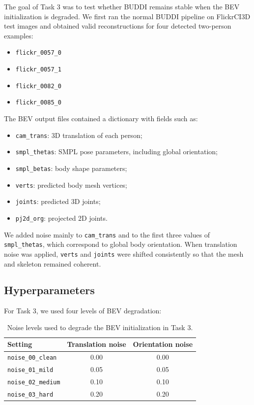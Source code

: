 \documentclass[10pt]{article}
\begin{document}
The goal of Task 3 was to test whether BUDDI remains stable when the BEV initialization is degraded. We first ran the normal BUDDI pipeline on FlickrCI3D test images and obtained valid reconstructions for four detected two-person examples:

\begin{itemize}
    \item \texttt{flickr\_0057\_0}
    \item \texttt{flickr\_0057\_1}
    \item \texttt{flickr\_0082\_0}
    \item \texttt{flickr\_0085\_0}
\end{itemize}

The BEV output files contained a dictionary with fields such as:

\begin{itemize}
    \item \texttt{cam\_trans}: 3D translation of each person;
    \item \texttt{smpl\_thetas}: SMPL pose parameters, including global orientation;
    \item \texttt{smpl\_betas}: body shape parameters;
    \item \texttt{verts}: predicted body mesh vertices;
    \item \texttt{joints}: predicted 3D joints;
    \item \texttt{pj2d\_org}: projected 2D joints.
\end{itemize}

We added noise mainly to \texttt{cam\_trans} and to the first three values of \texttt{smpl\_thetas}, which correspond to global body orientation. When translation noise was applied, \texttt{verts} and \texttt{joints} were shifted consistently so that the mesh and skeleton remained coherent.

\subsection{Hyperparameters}

For Task 3, we used four levels of BEV degradation:

\begin{table}[H]
\centering
\begin{tabular}{lcc}
\toprule
Setting & Translation noise & Orientation noise \\
\midrule
\texttt{noise\_00\_clean} & 0.00 & 0.00 \\
\texttt{noise\_01\_mild} & 0.05 & 0.05 \\
\texttt{noise\_02\_medium} & 0.10 & 0.10 \\
\texttt{noise\_03\_hard} & 0.20 & 0.20 \\
\bottomrule
\end{tabular}
\caption{Noise levels used to degrade the BEV initialization in Task 3.}
\label{tab:noise_levels}
\end{table}
\end{document}
